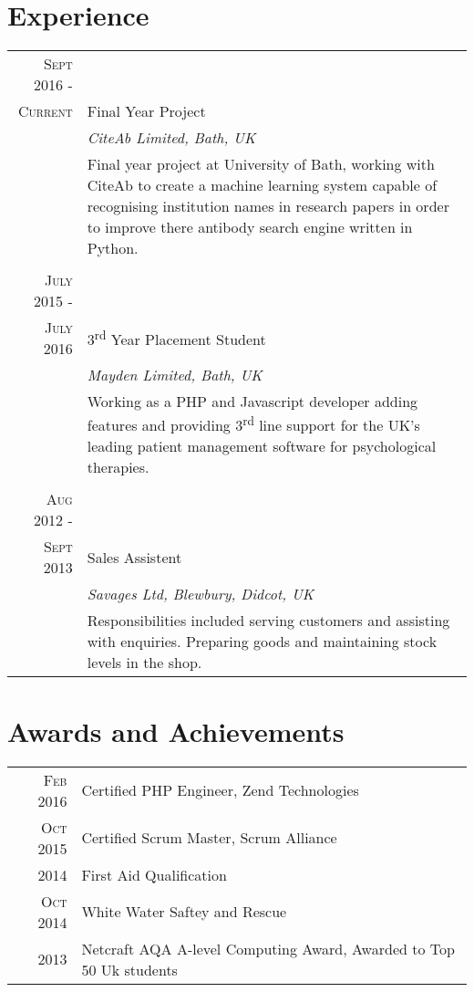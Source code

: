 \documentclass[a4paper,12pt]{article}
\begin{document}
\section{Experience}
\begin{tabular}{rp{11cm}}
\textsc{Sept} 2016 -\\ \textsc{Current} & Final Year Project \\&\emph{CiteAb Limited, Bath, UK}\\&\footnotesize{Final year project at University of Bath, working with CiteAb to create a machine learning system capable of recognising institution names
in research papers in order to improve there antibody search engine written in Python.}\\\multicolumn{2}{c}{} \\

\textsc{July} 2015 -\\ \textsc{July} 2016 & 3\textsuperscript{rd} Year Placement Student \\&\emph{Mayden Limited, Bath, UK}\\&\footnotesize{Working as a PHP and Javascript developer adding features and providing 3\textsuperscript{rd} line support for the UK's leading patient management software for psychological therapies.}\\\multicolumn{2}{c}{} \\
\textsc{Aug} 2012 -\\ \textsc{Sept} 2013 & Sales Assistent\\&\emph{Savages Ltd, Blewbury, Didcot, UK}\\&\footnotesize{Responsibilities included serving customers and assisting with enquiries. Preparing goods and maintaining stock levels in the shop.  }\\
\end{tabular}

\section{Awards and Achievements}
\begin{tabular}{rl}
 \textsc{Feb} 2016 & Certified PHP Engineer, Zend Technologies\\
 \textsc{Oct} 2015 & Certified Scrum Master, Scrum Alliance\\
 \textsc{} 2014 & First Aid Qualification\\
 \textsc{Oct} 2014 & White Water Saftey and Rescue\\
 \textsc{} 2013 & Netcraft AQA A-level Computing Award, Awarded to Top 50 Uk students\\
\end{tabular}
\end{document}
